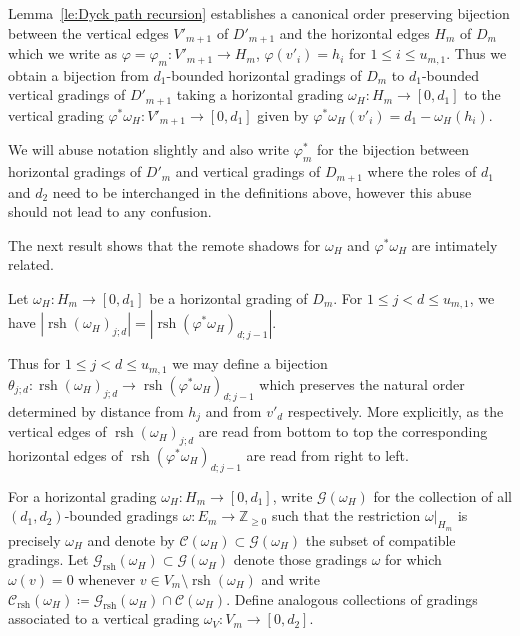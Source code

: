 \documentclass[ALCO,ThmDefs,Unicode,epreuves]{cedram}
\newcommand{\cC}{\mathcal{C}}
\newcommand{\cG}{\mathcal{G}}
\newcommand{\ZZ}{\mathbb{Z}}
\DeclareMathOperator{\rsh}{rsh}
\begin{document}
Lemma~\ref{le:Dyck path recursion} establishes a canonical order preserving bijection between the vertical edges $V'_{m+1}$ of $D'_{m+1}$ and the horizontal edges $H_m$ of $D_m$ which we write as $\varphi=\varphi_m:V'_{m+1}\to H_m$, $\varphi(v'_i)=h_i$ for $1\le i\le u_{m,1}$. 
Thus we obtain a bijection from $d_1$-bounded horizontal gradings of $D_m$ to $d_1$-bounded vertical gradings of $D'_{m+1}$ taking a horizontal grading $\omega_H:H_m\to[0,d_1]$ to the vertical grading $\varphi^*\omega_H:V'_{m+1}\to[0,d_1]$ given by $\varphi^*\omega_H(v'_i)=d_1-\omega_H(h_i)$.
\begin{remark}
 We will abuse notation slightly and also write $\varphi^*_m$ for the bijection between horizontal gradings of $D'_m$ and vertical gradings of $D_{m+1}$ where the roles of $d_1$ and $d_2$ need to be interchanged in the definitions above, however this abuse should not lead to any confusion.
\end{remark}

The next result shows that the remote shadows for $\omega_H$ and $\varphi^*\omega_H$ are intimately related.
\begin{lemma}
 \label{le:remote shadow cardinalities}
 Let $\omega_H:H_m\to[0,d_1]$ be a horizontal grading of $D_m$.
 For $1\le j<d\le u_{m,1}$, we have $|\rsh(\omega_H)_{j;d}|=|\rsh(\varphi^*\omega_H)_{d;j-1}|$.
\end{lemma}

Thus for $1\le j<d\le u_{m,1}$ we may define a bijection $\theta_{j;d}:\rsh(\omega_H)_{j;d}\to\rsh(\varphi^*\omega_H)_{d;j-1}$ which preserves the natural order determined by distance from $h_j$ and from $v'_d$ respectively. More explicitly, as the vertical edges of $\rsh(\omega_H)_{j;d}$ are read from bottom to top the corresponding horizontal edges of $\rsh(\varphi^*\omega_H)_{d;j-1}$ are read from right to left.

For a horizontal grading $\omega_H:H_m\to[0,d_1]$, write $\cG(\omega_H)$ for the collection of all $(d_1,d_2)$-bounded gradings $\omega:E_m\to\ZZ_{\ge0}$ such that the restriction $\omega|_{H_m}$ is precisely $\omega_H$ and denote by $\cC(\omega_H)\subset\cG(\omega_H)$ the subset of compatible gradings.
Let $\cG_{\rsh}(\omega_H)\subset\cG(\omega_H)$ denote those gradings $\omega$ for which $\omega(v)=0$ whenever $v\in V_m\setminus\rsh(\omega_H)$ and write $\cC_{\rsh}(\omega_H)\coloneqq \cG_{\rsh}(\omega_H)\cap\cC(\omega_H)$.
Define analogous collections of gradings associated to a vertical grading $\omega_V:V_m\to[0,d_2]$.
\end{document}
